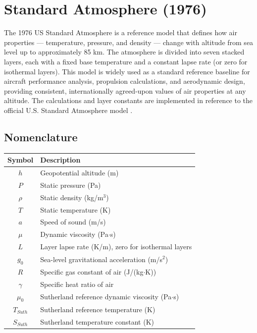 \chapter{Standard Atmosphere (1976)}

The 1976 US Standard Atmosphere is a reference model that defines how air properties --- temperature, pressure, and density --- change with altitude from sea level up to approximately 85 km. The atmosphere is divided into seven stacked layers, each with a fixed base temperature and a constant lapse rate (or zero for isothermal layers). This model is widely used as a standard reference baseline for aircraft performance analysis, propulsion calculations, and aerodynamic design, providing consistent, internationally agreed-upon values of air properties at any altitude. The calculations and layer constants are implemented in reference to the official U.S. Standard Atmosphere model \cite{std_atmos1976}.

\section{Nomenclature}

\begin{center}
\begin{tabular}{@{}cl@{}}
\toprule
Symbol & Description \\
\midrule
$h$ & Geopotential altitude (m) \\
$P$ & Static pressure (Pa) \\
$\rho$ & Static density (kg/m$^3$) \\
$T$ & Static temperature (K) \\
$a$ & Speed of sound (m/s) \\
$\mu$ & Dynamic viscosity (Pa$\cdot$s) \\
$L$ & Layer lapse rate (K/m), zero for isothermal layers \\
$g_0$ & Sea-level gravitational acceleration (m/s$^2$) \\
$R$ & Specific gas constant of air (J/(kg$\cdot$K)) \\
$\gamma$ & Specific heat ratio of air \\
$\mu_0$ & Sutherland reference dynamic viscosity (Pa$\cdot$s) \\
$T_{Suth}$ & Sutherland reference temperature (K) \\
$S_{Suth}$ & Sutherland temperature constant (K) \\
\bottomrule
\end{tabular}
\end{center}

